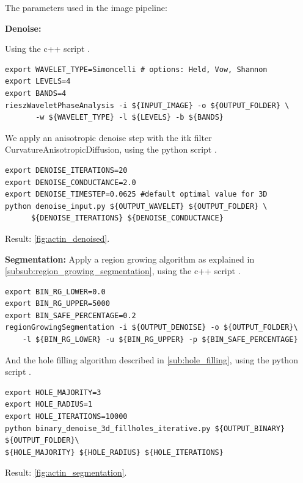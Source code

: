 The parameters used in the image pipeline:

\textbf{Denoise:}

\noindent Using the c++ script  \cite{phcerdan_rieszwaveletphaseanalysis_2018}.
\begin{verbatim}
export WAVELET_TYPE=Simoncelli # options: Held, Vow, Shannon
export LEVELS=4
export BANDS=4
rieszWaveletPhaseAnalysis -i ${INPUT_IMAGE} -o ${OUTPUT_FOLDER} \
       -w ${WAVELET_TYPE} -l ${LEVELS} -b ${BANDS}
\end{verbatim}

We apply an anisotropic denoise step with the itk filter CurvatureAnisotropicDiffusion,
using the python script  \citetitle*{phcerdan_denoise_input_2018} \cite{phcerdan_denoise_input_2018}.

\begin{verbatim}
export DENOISE_ITERATIONS=20
export DENOISE_CONDUCTANCE=2.0
export DENOISE_TIMESTEP=0.0625 #default optimal value for 3D
python denoise_input.py ${OUTPUT_WAVELET} ${OUTPUT_FOLDER} \
      ${DENOISE_ITERATIONS} ${DENOISE_CONDUCTANCE}
\end{verbatim}

Result: \autoref{fig:actin_denoised}.

\textbf{Segmentation:}
Apply a region growing algorithm as explained in \autoref{subsub:region_growing_segmentation},
using the c++ script   \cite{phcerdan_regionGrowingSegmentation_2018}.
\begin{verbatim}
export BIN_RG_LOWER=0.0
export BIN_RG_UPPER=5000
export BIN_SAFE_PERCENTAGE=0.2
regionGrowingSegmentation -i ${OUTPUT_DENOISE} -o ${OUTPUT_FOLDER}\
    -l ${BIN_RG_LOWER} -u ${BIN_RG_UPPER} -p ${BIN_SAFE_PERCENTAGE}
\end{verbatim}

And the hole filling algorithm described in \autoref{sub:hole_filling},
using the python script   \cite{phcerdan_binary_denoise_3d_fillholes_iterative_2018}.

\begin{verbatim}
export HOLE_MAJORITY=3
export HOLE_RADIUS=1
export HOLE_ITERATIONS=10000
python binary_denoise_3d_fillholes_iterative.py ${OUTPUT_BINARY} ${OUTPUT_FOLDER}\
${HOLE_MAJORITY} ${HOLE_RADIUS} ${HOLE_ITERATIONS}
\end{verbatim}

Result: \autoref{fig:actin_segmentation}.

